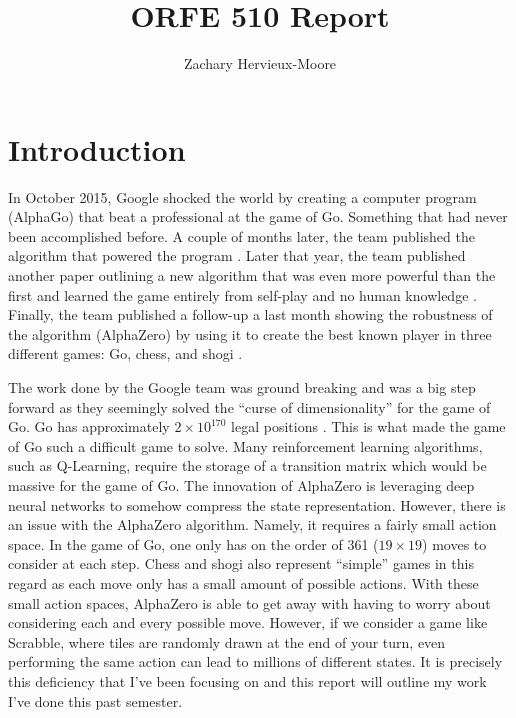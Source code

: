 \documentclass{article}
\title{ORFE 510 Report}
\author{Zachary Hervieux-Moore}
\date{\displaydate{date}}
\begin{document}
  \maketitle

  \clearpage

  \tableofcontents
  \listoffigures

  \clearpage

  \section{Introduction}

  In October 2015, Google shocked the world by creating a computer program (AlphaGo) that beat a professional at the game of Go. Something that had never been accomplished before. A couple of months later, the team published the algorithm that powered the program \cite{silver_mastering_2016}. Later that year, the team published another paper outlining a new algorithm that was even more powerful than the first and learned the game entirely from self-play and no human knowledge \cite{silver_mastering_2017}. Finally, the team published a follow-up a last month showing the robustness of the algorithm (AlphaZero) by using it to create the best known player in three different games: Go, chess, and shogi \cite{silver_mastering_2017-1}.

  The work done by the Google team was ground breaking and was a big step forward as they seemingly solved the ``curse of dimensionality'' for the game of Go. Go has approximately $2 \times 10^{170}$ legal positions \cite{tromp_sequence_2016}. This is what made the game of Go such a difficult game to solve. Many reinforcement learning algorithms, such as Q-Learning, require the storage of a transition matrix which would be massive for the game of Go. The innovation of AlphaZero is leveraging deep neural networks to somehow compress the state representation. However, there is an issue with the AlphaZero algorithm. Namely, it requires a fairly small action space. In the game of Go, one only has on the order of 361 ($19 \times 19$) moves to consider at each step. Chess and shogi also represent ``simple'' games in this regard as each move only has a small amount of possible actions. With these small action spaces, AlphaZero is able to get away with having to worry about considering each and every possible move. However, if we consider a game like Scrabble, where tiles are randomly drawn at the end of your turn, even performing the same action can lead to millions of different states. It is precisely this deficiency that I've been focusing on and this report will outline my work I've done this past semester.
\end{document}
